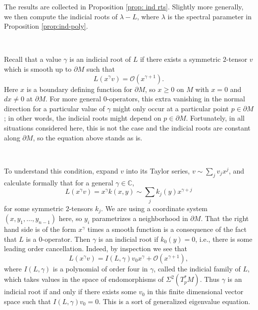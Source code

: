 \documentclass[10pt,reqno]{amsart}
\newcommand{\calO}{\mathcal O}
\newcommand{\del}{\partial}
\begin{document}
The results are collected in Proposition \ref{prop: ind rts}. Slightly more generally, we then compute the indicial roots of $\lambda - L$, where $\lambda$ is the spectral parameter in Proposition \ref{prop:ind-poly}. 

\ 

Recall that a value $\gamma$ is an indicial root of $L$ if there exists a symmetric $2$-tensor $v$ which is smooth up to $\del M$ such that
\[
L( x^\gamma v) = \calO( x^{\gamma + 1}).
\]
Here $x$ is a boundary defining function for $\del M$, so $x \geq 0$ on $M$ with $x = 0$ and $dx \neq 0$ at $\del M$. For more general $0$-operators,
this extra vanishing in the normal direction for a particular value of $\gamma$ might only occur at a particular point $p \in \del M$; in other words, the 
indicial roots might depend on $p \in \del M$.  Fortunately, in all situations considered here, this is not the case and the indicial roots are constant
along $\del M$, so the equation above stands as is. 

\

To understand this condition, expand $v$ into its Taylor series, $v \sim \sum_j v_j x^j$, and calculate formally that for a general $\gamma \in \mathbb C$, 
\[
L( x^\gamma v)  = x^{\gamma} k(x,y) \sim \sum_j k_j(y) x^{\gamma + j}
\]
for some symmetric $2$-tensors $k_j$.  We are using a coordinate system $(x, y_1, \ldots, y_{n-1})$ here, so $y_i$ parametrizes a neighborhood in $\del M$. 
That the right hand side is of the form $x^\gamma$ times a smooth function is a consequence of
the fact that $L$ is a $0$-operator. Then $\gamma$ is an indicial root if $k_0(y) = 0$, i.e., there is some leading order cancellation.  Indeed, 
by inspection we see that
\[
L( x^\gamma v) = I(L, \gamma) v_0 x^\gamma + \calO(x^{\gamma +1}),
\]
where $I(L,\gamma)$ is a polynomial of order four in $\gamma$, called the indicial family of $L$, which takes values in the space of endomorphisms
of $\Sigma^2(T^*_p M)$. Thus $\gamma$ is an indicial root if and only if there exists some $v_0$ in this finite dimensional vector space 
such that $I(L,\gamma)v_0 = 0$. This is a sort of generalized eigenvalue equation.

\ 
\end{document}
